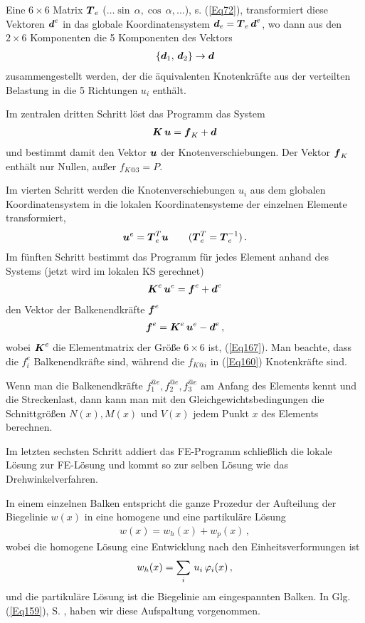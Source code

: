 Eine $6 \times 6$ Matrix $\mbox{\boldmath $T$}_e$ ($\ldots \sin\,\alpha, \cos\,\alpha, \ldots$), s. (\ref{Eq72}), transformiert diese Vektoren $\mbox{\boldmath $d$}^e$ in das globale Koordinatensystem $\mbox{\boldmath $d$}_e = \mbox{\boldmath $T$}_e\,\mbox{\boldmath $d$}^e$, wo dann aus den $2 \times 6$ Komponenten die 5 Komponenten des Vektors
\begin{align}
\{\mbox{\boldmath $d$}_1,\, \mbox{\boldmath $d$}_2\} \rightarrow \mbox{\boldmath $d$}
\end{align}
zusammengestellt werden, der die \"{a}quivalenten Knotenkr\"{a}fte aus der verteilten Belastung in die 5 Richtungen $u_i$ enth\"{a}lt.

Im zentralen dritten Schritt l\"{o}st das Programm das System
\begin{align}\label{Eq160}
\mbox{\boldmath $K$}\,\mbox{\boldmath $u$} = \mbox{\boldmath $f$}_K + \mbox{\boldmath $d$}
\end{align}
und bestimmt damit den Vektor $\mbox{\boldmath $u$}$ der Knotenverschiebungen. Der Vektor $\mbox{\boldmath $f$}_K$ enth\"{a}lt nur Nullen, au{\ss}er $f_{K @3} = P$.

Im vierten Schritt werden die Knotenverschiebungen $u_i$ aus dem globalen Koordinatensystem in die lokalen Koordinatensysteme der einzelnen Elemente transformiert,
\begin{align}
\mbox{\boldmath $u$}^e = \mbox{\boldmath $T$}_e^T \mbox{\boldmath $u$} \qquad (\mbox{\boldmath $T$}_e^T = \mbox{\boldmath $T$}_e^{-1})\,.
\end{align}
Im f\"{u}nften Schritt bestimmt das Programm f\"{u}r jedes Element anhand des Systems (jetzt wird im lokalen KS gerechnet)
\begin{align}
\mbox{\boldmath $K$}^e\,\mbox{\boldmath $u$}^e = \mbox{\boldmath $f$}^e + \mbox{\boldmath $d$}^e
\end{align}
den Vektor der Balkenendkr\"{a}fte $\mbox{\boldmath $f$}^e$
\begin{align}
\mbox{\boldmath $f$}^e = \mbox{\boldmath $K$}^e\,\mbox{\boldmath $u$}^e - \mbox{\boldmath $d$}^e\,,
\end{align}
wobei $\mbox{\boldmath $K$}^e$ die Elementmatrix der Gr\"{o}{\ss}e $6 \times 6$ ist, (\ref{Eq167}). Man beachte, dass die $f_i^e$ Balkenendkr\"{a}fte sind, w\"{a}hrend die $f_{K @i}$ in (\ref{Eq160}) Knotenkr\"{a}fte sind.

Wenn man die Balkenendkr\"{a}fte $f_1^{@e}, f_2^{@e}, f_3^{@e}$ am Anfang des Elements kennt und die Streckenlast, dann kann man mit den Gleichgewichtsbedingungen die Schnittgr\"{o}{\ss}en $N(x), M(x)$ und $V(x)$ jedem Punkt $x$ des Elements berechnen.

Im letzten sechsten Schritt addiert das FE-Programm schlie{\ss}lich die lokale L\"{o}sung zur FE-L\"{o}sung und kommt so zur selben L\"{o}sung wie das Drehwinkelverfahren.

In einem einzelnen Balken entspricht die ganze Prozedur der Aufteilung der Biegelinie $w(x)$ in eine homogene und eine partikul\"{a}re L\"{o}sung
\begin{align}
w(x) = w_h(x) + w_p(x)\,,
\end{align}
wobei die homogene L\"{o}sung eine Entwicklung nach den Einheitsverformungen ist
\begin{align}
w_h(x) = \sum_i\,u_i\,\varphi_i(x)\,,
\end{align}
und die partikul\"{a}re L\"{o}sung ist die Biegelinie am eingespannten Balken.
In Glg. (\ref{Eq159}), S. \pageref{Eq159}, haben wir diese Aufspaltung vorgenommen.

